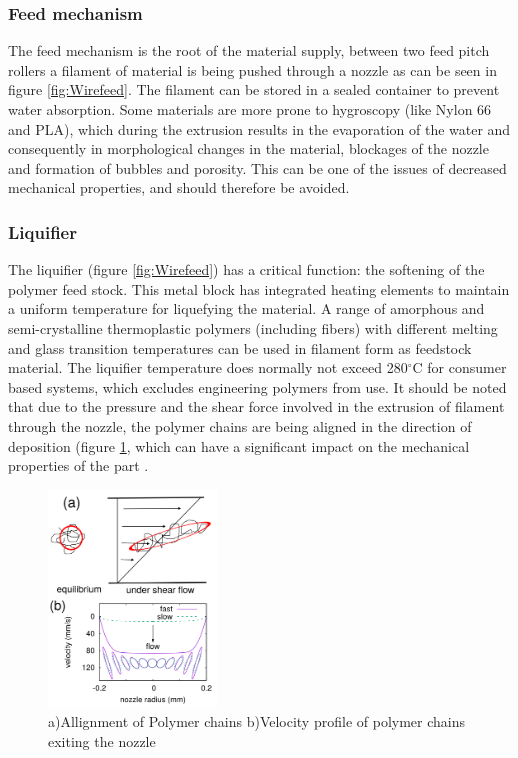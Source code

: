 \subsubsection{Feed mechanism}
    \label{Feed mechanism}
The feed mechanism is the root of the material supply, between two feed pitch rollers a filament of material is being pushed through a nozzle as can be seen in figure \ref{fig:Wirefeed}. The filament can be stored in a sealed container to prevent water absorption. Some materials are more prone to hygroscopy (like Nylon 66 and PLA), which during the extrusion results in the evaporation of the water and consequently in morphological changes in the material, blockages of the nozzle and formation of bubbles and porosity. This can be one of the issues of decreased mechanical properties, and should therefore be avoided. 

\subsubsection{Liquifier}
    \label{Liquifier}
The liquifier (figure \ref{fig:Wirefeed}) has a critical function: the softening of the polymer feed stock. This metal block has integrated heating elements to maintain a uniform temperature for liquefying the material.  A range of amorphous and semi-crystalline thermoplastic polymers (including fibers) with different melting and glass transition temperatures can be used in filament form as feedstock material. The liquifier temperature does normally not exceed 280$^{\circ}$C for consumer based systems, which excludes engineering polymers from use. It should be noted that due to the pressure and the shear force involved in the extrusion of filament through the nozzle, the polymer chains are being aligned in the direction of deposition (figure \ref{fig:polymerallignment}, which can have a significant impact on the mechanical properties of the part \cite{Mcilroy2017DisentanglementManufacturing}.

\begin{figure}[H]
    \centering
    \includegraphics[width=0.4\textwidth]{chapter_2/figures/polymerallignment.PNG}
    \caption{a)Allignment of Polymer chains b)Velocity profile of polymer chains exiting the nozzle\cite{Mcilroy2017DisentanglementManufacturing}}
    \label{fig:polymerallignment}
\end{figure}

